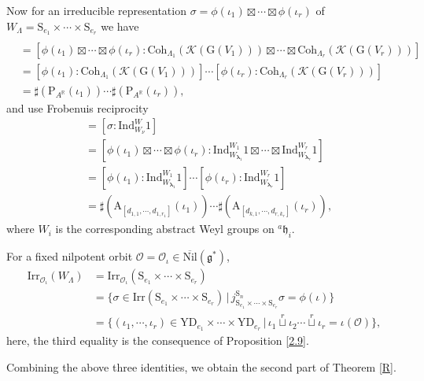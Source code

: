 \documentclass[12pt, a4paper]{amsart}
\numberwithin{equation}{section}
\newcommand{\blam}{{\boldsymbol{\lambda}}}
\newcommand{\BR}{{\mathbb {R}}}
\newcommand{\CK}{{\mathcal {K}}}
\newcommand{\CO}{{\mathcal {O}}}
\newcommand{\fg}{\mathfrak{g}}
\newcommand{\fh}{\mathfrak{h}}
\newcommand{\G}{{\mathrm{G}}}
\newcommand{\A}{{\mathrm{A}}}
\newcommand{\Ind}{{\mathrm{Ind}}}
\newcommand{\Irr}{{\mathrm{Irr}}}
\newcommand{\Nil}{{\mathrm{Nil}}}
\newcommand{\set}[2]{\{#1\,|\,#2\}}
\renewcommand{\bar}{\overline}
\begin{document}
Now for an irreducible representation $\sigma = \phi(\iota_1) \boxtimes \cdots \boxtimes \phi(\iota_r)$ of $W_{\Lambda} = \mathrm{S}_{e_1} \times \cdots \times \mathrm{S}_{e_r}$ we have 
\begin{align*}
[\sigma:&\mathrm{Coh}_{\Lambda}(\CK(G))] \\
 & = [\phi(\iota_1) \boxtimes \cdots \boxtimes \phi(\iota_r) : \mathrm{Coh}_{\Lambda_1}(\CK(\G(V_1))) \boxtimes \cdots \boxtimes \mathrm{Coh}_{\Lambda_r}(\CK(\G(V_r)))]\\
 & = [\phi(\iota_1): \mathrm{Coh}_{\Lambda_1}(\CK(\G(V_1)))]\cdots [\phi(\iota_r):\mathrm{Coh}_{\Lambda_r}(\CK(\G(V_r)))]\\
 & = \sharp(\mathrm{P}_{A^\BR}(\iota_1)) \cdots \sharp(\mathrm{P}_{A^\BR}(\iota_r)),
\end{align*}
and use Frobenuis reciprocity
\begin{align*}
    [1_{W_\nu} : \sigma ] & = [\sigma: \Ind_{W_{\nu}}^{W}1]\\
    & = [\phi(\iota_1) \boxtimes \cdots \boxtimes \phi(\iota_r): \Ind_{W_{\blam_1}}^{W_1}1 \boxtimes \cdots \boxtimes \Ind_{W_{\blam_r}}^{W_r}1 ]\\
    & = [\phi(\iota_1):\Ind_{W_{\blam_1}}^{W_1}1] \cdots [\phi(\iota_r):\Ind_{W_{\blam_r}}^{W_r}1]\\
    & = \sharp(\A_{[d_{1,1},\cdots,d_{1,r_1}]}(\iota_1))\cdots \sharp(\A_{[d_{k,1},\cdots,d_{r,k_r}]}(\iota_r)),
\end{align*}
where $W_i$ is the corresponding abstract Weyl groups on $^{a}\fh_i$.

For a fixed nilpotent orbit $\CO = \CO_{\iota} \in \bar{\Nil}(\fg^*)$, 
\begin{align*}
    \Irr_{\CO_{\iota}}(W_{\Lambda}) & = \Irr_{\CO_{\iota}}(\mathrm{S}_{e_1} \times \cdots \times \mathrm{S}_{e_r})\\
    & = \set{\sigma \in \Irr(\mathrm{S}_{e_1} \times \cdots \times \mathrm{S}_{e_r})}{j_{\mathrm{S}_{e_1} \times \cdots \times \mathrm{S}_{e_r}}^{\mathrm{S}_n}\sigma = \phi(\iota)}\\
    & = \set{(\iota_1,\cdots,\iota_r) \in \mathrm{YD}_{e_1} \times \cdots \times \mathrm{YD}_{e_r}}{\iota_1 \mathop{\sqcup}\limits^r \iota_2 \cdots \mathop{\sqcup}\limits^r  \iota_r = \iota(\CO)},
\end{align*}
here, the third equality is the consequence of Proposition \ref{2.9}.

Combining the above three identities, we obtain the second part of Theorem \ref{R}.
\end{document}
